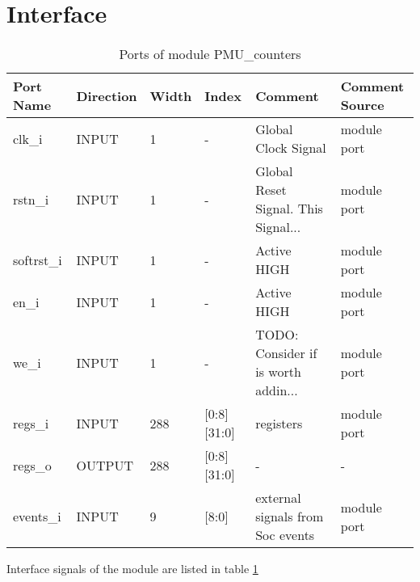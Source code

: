 \section{Interface}\label{interface}
\label{chapter 4}
\begin{table}[ht]
	\scriptsize
	\centering
	\begin{tabular}{llllll}
		\hline
		Port Name & Direction & Width & Index & Comment & Comment Source
		\\
		\hline
		clk\_i & INPUT & 1 & - & Global Clock Signal & module port
		\\
		rstn\_i & INPUT & 1 & - & Global Reset Signal. This Signal... & module port
		\\
		softrst\_i & INPUT & 1 & - & Active HIGH & module port
		\\
		en\_i & INPUT & 1 & - & Active HIGH & module port
		\\
		we\_i & INPUT & 1 & - & TODO: Consider if is worth addin... & module port
		\\
		regs\_i & INPUT & 288 & [0:8][31:0] & registers & module port
		\\
		regs\_o & OUTPUT & 288 & [0:8][31:0] & - & -\\
		events\_i & INPUT & 9 & [8:0] & external signals from Soc events & module port
		\\
		\hline
	\end{tabular}
	\caption{Ports of module PMU\_counters}
	\label{port:PMU_counters}
\end{table}
Interface signals of the module are listed in table \ref{port:PMU_counters}

